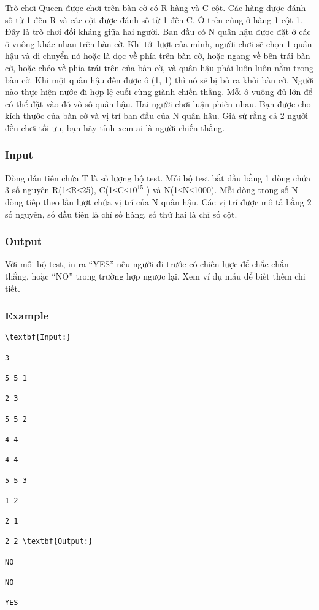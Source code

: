 







    Trò chơi Queen được chơi trên bàn cờ có R hàng và C cột. Các hàng dược đánh số từ 1 đến R và các cột được đánh số từ 1 đến C. Ô trên cùng ở hàng 1 cột 1. Đây là trò chơi đối kháng giữa hai người. Ban đầu có N quân hậu được đặt ở các ô vuông khác nhau trên bàn cờ. Khi tới lượt của mình, người chơi sẽ chọn 1 quân hậu và di chuyển nó hoặc là dọc về phía trên bàn cờ, hoặc ngang về bên trái bàn cờ, hoặc chéo về phía trái trên của bàn cờ, và quân hậu phải luôn luôn nằm trong bàn cờ. Khi một quân hậu đến được ô (1, 1) thì nó sẽ bị bỏ ra khỏi bàn cờ. Người nào thực hiện nước đi hợp lệ cuối cùng giành chiến thắng. Mỗi ô vuông đủ lớn để có thể đặt vào đó vô số quân hậu. Hai người chơi luận phiên nhau. Bạn được cho kích thước của bàn cờ và vị trí ban đầu của N quân hậu. Giả sử rằng cả 2 người đều chơi tối ưu, bạn hãy tính xem ai là người chiến thắng.   

\subsubsection{   Input  }

    Dòng đầu tiên chứa T là số lượng bộ test. Mỗi bộ test bắt đầu bằng 1 dòng chứa 3 số nguyên R(1≤R≤25), C(1≤C≤$10^{15}$    ) và N(1≤N≤1000). Mỗi dòng trong số N dòng tiếp theo lần lượt chứa vị trí của N quân hậu. Các vị trí được mô tả bằng 2 số nguyên, số đầu tiên là chỉ số hàng, số thứ hai là chỉ số cột.   

\subsubsection{   Output  }

    Với mỗi bộ test, in ra “YES” nếu người đi trước có chiến lược để chắc chắn thắng, hoặc “NO” trong trường hợp ngược lại. Xem ví dụ mẫu để biết thêm chi tiết.   

\subsubsection{   Example  }
\begin{verbatim}
\textbf{Input:}

3 

5 5 1 

2 3 

5 5 2 

4 4 

4 4 

5 5 3 

1 2 

2 1 

2 2 \textbf{Output:}

NO 

NO 

YES \end{verbatim}

